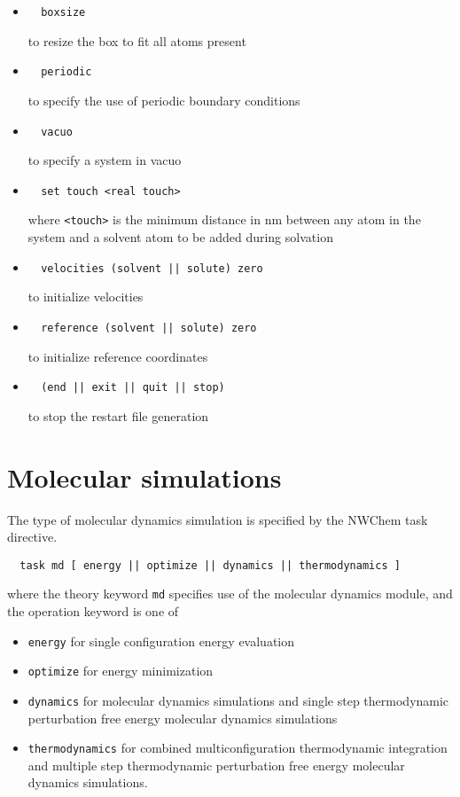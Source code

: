 \begin{itemize}
\item
\begin{verbatim}
  boxsize
\end{verbatim}
to resize the box to fit all atoms present

\item
\begin{verbatim}
  periodic
\end{verbatim}
to specify the use of periodic boundary conditions

\item
\begin{verbatim}
  vacuo
\end{verbatim}
to specify a system in vacuo

\item
\begin{verbatim}
  set touch <real touch>
\end{verbatim}
where \verb+<touch>+ is the minimum distance in nm between any atom in
the system and a solvent atom to be added during solvation

\item
\begin{verbatim}
  velocities (solvent || solute) zero
\end{verbatim}
to initialize velocities

\item
\begin{verbatim}
  reference (solvent || solute) zero
\end{verbatim}
to initialize reference coordinates

\item
\begin{verbatim}
  (end || exit || quit || stop)
\end{verbatim}
to stop the restart file generation
\end{itemize}

\section{Molecular simulations}
The type of molecular dynamics simulation is specified by the
NWChem task directive.
\begin{verbatim}
  task md [ energy || optimize || dynamics || thermodynamics ]
\end{verbatim}
where the theory keyword {\tt md} specifies use of the molecular
dynamics module, and the operation keyword is one of
\begin{itemize}
\item
{\tt energy} for single configuration energy evaluation
\item
{\tt optimize} for energy minimization
\item
{\tt dynamics} for molecular dynamics simulations and single step
thermodynamic perturbation free energy molecular dynamics simulations
\item
{\tt thermodynamics} for combined multiconfiguration thermodynamic
integration and multiple step thermodynamic perturbation free
energy molecular dynamics simulations.
\end{itemize}

